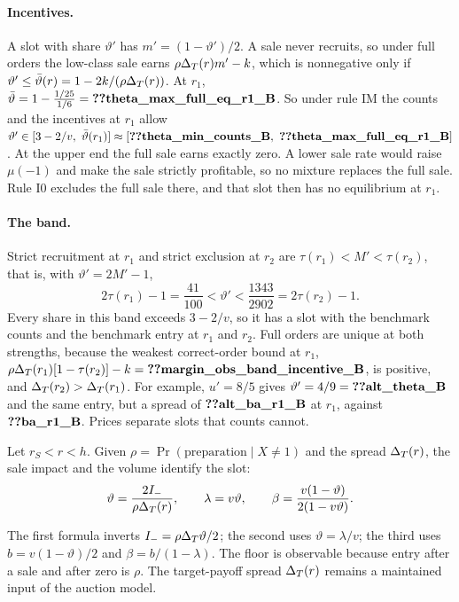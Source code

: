 \paragraph{Incentives.} A slot with share \(\vartheta'\) has \(m'=(1-\vartheta')/2\). A sale never recruits, so under
full orders the low-class sale earns \(\rho\Delta_T(r)m'-k\), which is nonnegative only if
\(\vartheta'\le\bar\vartheta(r)=1-2k/(\rho\Delta_T(r))\). At \(r_1\), \(\bar\vartheta=1-\frac{1/25}{1/6}=\reg{theta_max_full_eq_r1_B}\).
So under rule IM the counts and the incentives at \(r_1\) allow
\(\vartheta'\in[3-2/v,\ \bar\vartheta(r_1)]\approx[\reg{theta_min_counts_B},\ \reg{theta_max_full_eq_r1_B}]\). At the
upper end the full sale earns exactly zero. A lower sale rate would raise \(\mu(-1)\) and make the sale strictly
profitable, so no mixture replaces the full sale. Rule I0 excludes the full sale there, and that slot then has no
equilibrium at \(r_1\).

\paragraph{The band.} Strict recruitment at \(r_1\) and strict exclusion at \(r_2\) are \(\tau(r_1)<M'<\tau(r_2)\), that
is, with \(\vartheta'=2M'-1\),
\[
2\tau(r_1)-1=\frac{41}{100}<\vartheta'<\frac{1343}{2902}=2\tau(r_2)-1.
\]
Every share in this band exceeds \(3-2/v\), so it has a slot with the benchmark counts and the benchmark entry at
\(r_1\) and \(r_2\). Full orders are unique at both strengths, because the weakest correct-order bound at \(r_1\),
\(\rho\DT(r_1)[1-\tau(r_2)]-k=\reg{margin_obs_band_incentive_B}\), is positive, and \(\Delta_T(r_2)>\Delta_T(r_1)\). For example, \(u'=8/5\) gives
\(\vartheta'=4/9=\reg{alt_theta_B}\) and the same entry, but a spread of \(\reg{alt_ba_r1_B}\) at \(r_1\), against
\(\reg{ba_r1_B}\). Prices separate slots that counts cannot.

\begin{resultbox}
Let \(r_S<r<h\). Given \(\rho=\Pr(\text{preparation}\mid X\ne1)\) and the spread \(\Delta_T(r)\), the sale impact and the
volume identify the slot:
\[
\vartheta=\frac{2I_-}{\rho\Delta_T(r)},\qquad \lambda=v\vartheta,\qquad \beta=\frac{v(1-\vartheta)}{2(1-v\vartheta)}.
\]
\end{resultbox}
The first formula inverts \(I_-=\rho\Delta_T\vartheta/2\); the second uses \(\vartheta=\lambda/v\); the third uses
\(b=v(1-\vartheta)/2\) and \(\beta=b/(1-\lambda)\). The floor is observable because entry after a sale and after zero is
\(\rho\). The target-payoff spread \(\Delta_T(r)\) remains a maintained input of the auction model.

